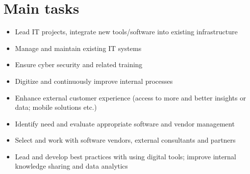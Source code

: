 \section*{Main tasks}
\begin{itemize}
    \item Lead IT projects, integrate new tools/software into existing infrastructure
    \item Manage and maintain existing IT systems
    \item Ensure cyber security and related training
    \item Digitize and continuously improve internal processes
    \item Enhance external customer experience (access to more and better insights or data; mobile solutions etc.)
    \item Identify need and evaluate appropriate software and vendor management
    \item Select and work with software vendors, external consultants and partners
    \item Lead and develop best practices with using digital tools; improve internal knowledge sharing and data analytics
\end{itemize}


